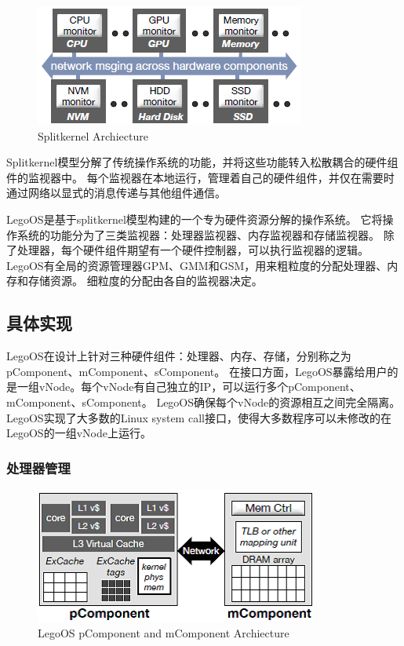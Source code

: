 \begin{figure}[h]
\centering
\includegraphics[scale=1.00]{Figures/system/splitkernel.png}
\decoRule
\caption{Splitkernel Archiecture}
\label{fig:legoos_archiecture}
\end{figure}

Splitkernel模型分解了传统操作系统的功能，并将这些功能转入松散耦合的硬件组件的监视器中。
每个监视器在本地运行，管理着自己的硬件组件，并仅在需要时通过网络以显式的消息传递与其他组件通信。

LegoOS是基于splitkernel模型构建的一个专为硬件资源分解的操作系统。
它将操作系统的功能分为了三类监视器：处理器监视器、内存监视器和存储监视器。
除了处理器，每个硬件组件期望有一个硬件控制器，可以执行监视器的逻辑。
LegoOS有全局的资源管理器GPM、GMM和GSM，用来粗粒度的分配处理器、内存和存储资源。
细粒度的分配由各自的监视器决定。

\subsection{具体实现}

LegoOS在设计上针对三种硬件组件：处理器、内存、存储，分别称之为pComponent、mComponent、sComponent。
在接口方面，LegoOS暴露给用户的是一组vNode。每个vNode有自己独立的IP，可以运行多个pComponent、mComponent、sComponent。
LegoOS确保每个vNode的资源相互之间完全隔离。
LegoOS实现了大多数的Linux system call接口，使得大多数程序可以未修改的在LegoOS的一组vNode上运行。

\subsubsection{处理器管理}

\begin{figure}[h]
\centering
\includegraphics[scale=1.00]{Figures/system/pcomponent_mcomponent.png}
\decoRule
\caption{LegoOS pComponent and mComponent Archiecture}
\label{fig:legoos_archiecture}
\end{figure}

